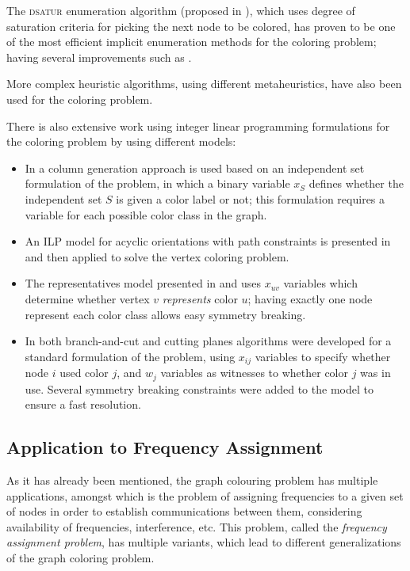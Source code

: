 The \textsc{dsatur} enumeration algorithm (proposed in \cite{brelaz1979new}), which uses degree of saturation criteria for picking the next node to be colored, has proven to be one of the most efficient implicit enumeration methods for the coloring problem; having several improvements such as \cite{sewell1996improved}.

More complex heuristic algorithms, using different metaheuristics, have also been used for the coloring problem.

There is also extensive work using integer linear programming formulations for the coloring problem by using different models:
\begin{itemize}
\item{In \cite{mehrotra1996column} a column generation approach is used based on an independent set formulation of the problem, in which a binary variable $x_S$ defines whether the independent set $S$ is given a color label or not; this formulation requires a variable for each possible color class in the graph.}
\item{An ILP model for acyclic orientations with path constraints is presented in \cite{figueiredo2005acyclic} and then applied to solve the vertex coloring problem.}
\item{The representatives model presented in \cite{campelo2004cliques} and \cite{campelo2008asymmetric} uses $x_{uv}$ variables which determine whether vertex $v$ \textit{represents} color $u$; having exactly one node represent each color class allows easy symmetry breaking.}
\item{In \cite{mendez2006branch,mendez2008cutting} both branch-and-cut and cutting planes algorithms were developed for a standard formulation of the problem, using $x_{ij}$ variables to specify whether node $i$ used color $j$, and $w_j$ variables as witnesses to whether color $j$ was in use. Several symmetry breaking constraints were added to the model to ensure a fast resolution.}
\end{itemize}

\subsection*{Application to Frequency Assignment}

As it has already been mentioned, the graph colouring problem has multiple applications, amongst which is the problem of assigning frequencies to a given set of nodes in order to establish communications between them, considering availability of frequencies, interference, etc. This problem, called the \textit{frequency assignment problem}, has multiple variants, which lead to different generalizations of the graph coloring problem.

